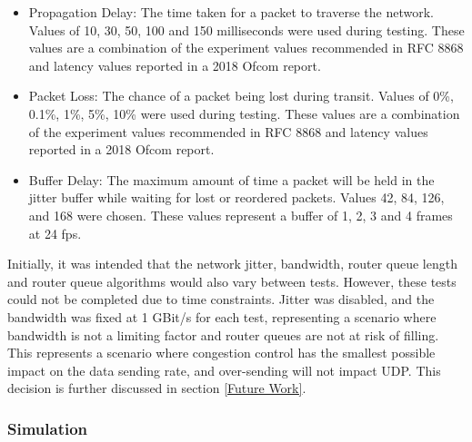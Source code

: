 \documentclass{mpaper}
\begin{document}
\begin{itemize}
  \item Propagation Delay: The time taken for a packet to traverse the network. Values of 10, 30, 50, 100 and 150 milliseconds were used during testing. These values are a combination of the experiment values recommended in RFC 8868\cite{RFC8868} and latency values reported in a 2018 Ofcom report\cite{OFCOM}.
  \item Packet Loss: The chance of a packet being lost during transit. Values of 0\%, 0.1\%, 1\%, 5\%, 10\% were used during testing. These values are a combination of the experiment values recommended in RFC 8868\cite{RFC8868} and latency values reported in a 2018 Ofcom report\cite{OFCOM}.
  \item Buffer Delay: The maximum amount of time a packet will be held in the jitter buffer while waiting for lost or reordered packets. Values 42, 84, 126, and 168 were chosen. These values represent a buffer of 1, 2, 3 and 4 frames at 24 fps.
\end{itemize}

Initially, it was intended that the network jitter, bandwidth, router queue length and router queue algorithms would also vary between tests. However, these tests could not be completed due to time constraints. Jitter was disabled, and the bandwidth was fixed at 1 GBit/s for each test, representing a scenario where bandwidth is not a limiting factor and router queues are not at risk of filling. This represents a scenario where congestion control has the smallest possible impact on the data sending rate, and over-sending will not impact UDP. This decision is further discussed in section \ref{Future Work}.

\subsubsection{Simulation} \label{Simulation}
\end{document}
